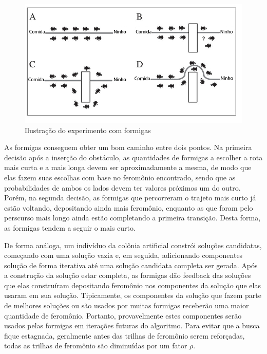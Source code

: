 \begin{figure}[h]
	\caption{\label{fig_aco}Ilustração do experimento com formigas}
	\begin{center}
	    \includegraphics[scale=0.5]{imagens/aco-sample.png}
	\end{center}
\end{figure}


As formigas conseguem obter um bom caminho entre dois pontos. Na primeira decisão após a inserção do obstáculo, as quantidades de formigas a escolher a rota mais curta e a mais longa devem ser aproximadamente a mesma, de modo que elas fazem suas escolhas com base no feromônio encontrado, sendo que as probabilidades de ambos os lados devem ter valores próximos um do outro. Porém, na segunda decisão, as formigas que percorreram o trajeto mais curto já estão voltando, depositando ainda mais feromônio, enquanto as que foram pelo perscurso mais longo ainda estão completando a primeira transição. Desta forma, as formigas tendem a seguir o mais curto.

De forma análoga, um indivíduo da colônia artificial constrói soluções candidatas, começando com uma solução vazia e, em seguida, adicionando componentes solução de forma iterativa até uma solução candidata completa ser gerada. Após a construção da solução estar completa, as formigas dão feedback das soluções que elas construíram depositando feromônio nos componentes da solução que elas usaram em sua solução. Tipicamente, os componentes da solução que fazem parte de melhores soluções ou são usados por muitas formigas receberão uma maior quantidade de feromônio. Portanto, provavelmente estes componentes serão usados pelas formigas em iterações futuras do algoritmo. Para evitar que a busca fique estagnada, geralmente antes das trilhas de feromônio serem reforçadas, todas as trilhas de feromônio são diminuídas por um fator $\rho$.

